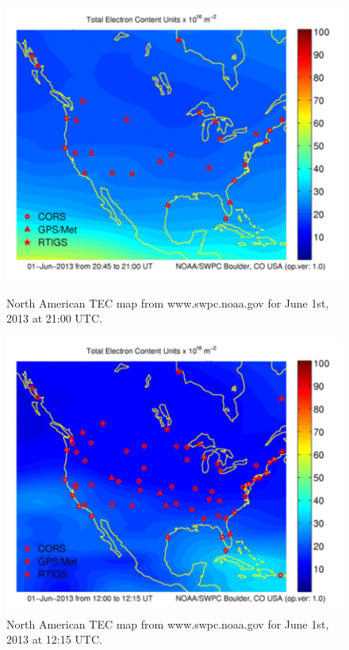 \begin{figure}[htb]
\centering
\begin{minipage}[b]{0.48\textwidth}
\centering
\includegraphics[width=0.95\linewidth]{Ionosphere/figures/NA_TEC_day.png}
\caption{North American TEC map from www.swpc.noaa.gov for June 1st, 2013 at 21:00 UTC.   }
\label{Fig:day_TEC_NA}
\end{minipage}%
\begin{minipage}[b]{0.02\textwidth}
\hspace{1cm}
\end{minipage}%
\begin{minipage}[b]{0.48\textwidth}
\centering
\includegraphics[width=0.95\linewidth]{Ionosphere/figures/NA_TEC_night.png}
\caption{North American TEC map from www.swpc.noaa.gov for June 1st, 2013 at 12:15 UTC.  }
\label{Fig:night_TEC_NA}
\end{minipage}
\end{figure}

